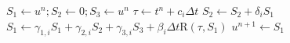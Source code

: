     \centering
    \caption{Low storage implementation (3S*)}
    \label{ALG:Time:Algorithms:OERK}
    \begin{algorithmic}[1]
      \STATE $S_1 \leftarrow u^n ; S_2 \leftarrow 0 ; S_3 \leftarrow u^n$
      \STATE $\tau \leftarrow t^n + c_i \Delta t$
      \STATE $S_2 \leftarrow S_2 + \delta_i S_1$
      \STATE $S_1 \leftarrow \gamma_{1,i} S_1 + 
                             \gamma_{2,i} S_2 +
                             \gamma_{3,i} S_3 + 
                      \beta_i \Delta t \bm{\mathrm{R}}\left(\tau,S_1\right)$
      \ENDFOR
      \STATE $u^{n+1} \leftarrow S_1$
    \end{algorithmic}
